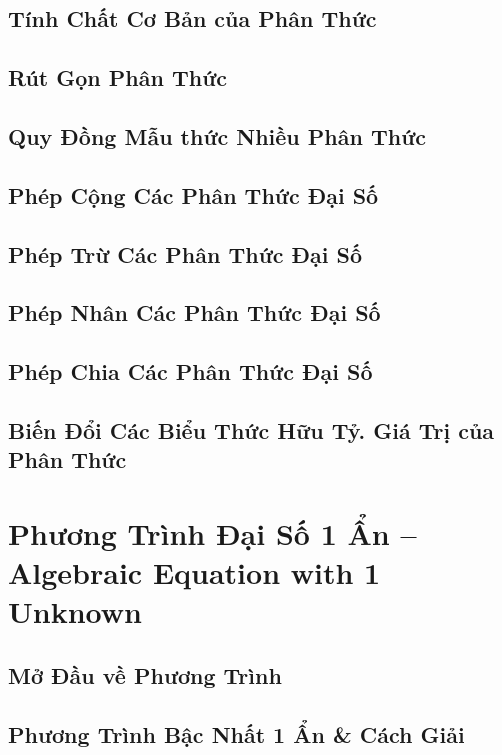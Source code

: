 \documentclass[oneside]{book}
\numberwithin{equation}{section}
\begin{document}
\section{Tính Chất Cơ Bản của Phân Thức}

\section{Rút Gọn Phân Thức}

\section{Quy Đồng Mẫu thức Nhiều Phân Thức}

\section{Phép Cộng Các Phân Thức Đại Số}

\section{Phép Trừ Các Phân Thức Đại Số}

\section{Phép Nhân Các Phân Thức Đại Số}

\section{Phép Chia Các Phân Thức Đại Số}

\section{Biến Đổi Các Biểu Thức Hữu Tỷ. Giá Trị của Phân Thức}


\chapter{Phương Trình Đại Số 1 Ẩn -- Algebraic Equation with 1 Unknown}

\section{Mở Đầu về Phương Trình}

\section{Phương Trình Bậc Nhất 1 Ẩn \& Cách Giải}
\end{document}
